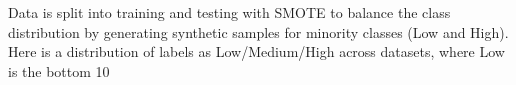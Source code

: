 \documentclass[preview]{standalone}
\begin{document}
Data is split into training and testing with SMOTE to balance the class distribution by generating synthetic samples for minority classes (Low and High).\\Here is a distribution of labels as Low/Medium/High across datasets, where Low is the bottom 10%
\end{document}
